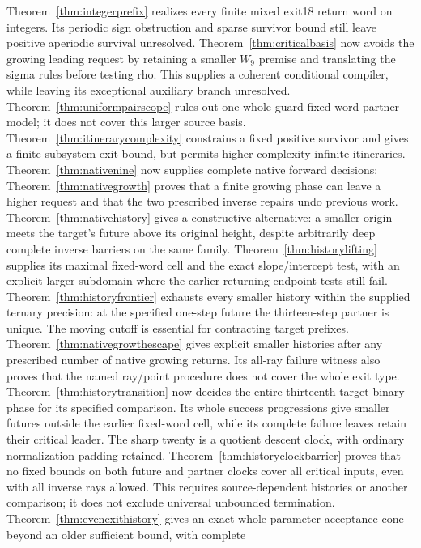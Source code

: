 \documentclass[11pt]{article}
\begin{document}
Theorem~\ref{thm:integerprefix} realizes every finite mixed exit18 return
word on integers. Its periodic sign obstruction and sparse survivor bound
still leave positive aperiodic survival unresolved.
Theorem~\ref{thm:criticalbasis} now avoids the growing leading request
by retaining a smaller $W_9$ premise and translating the sigma rules
before testing rho. This supplies a coherent conditional compiler,
while leaving its exceptional auxiliary branch unresolved.
Theorem~\ref{thm:uniformpairscope} rules out one whole-guard fixed-word
partner model; it does not cover this larger source basis.
Theorem~\ref{thm:itinerarycomplexity} constrains a fixed positive
survivor and gives a finite subsystem exit bound, but permits
higher-complexity infinite itineraries.
Theorem~\ref{thm:nativenine} now supplies complete native forward decisions;
Theorem~\ref{thm:nativegrowth} proves that a finite growing phase can
leave a higher request and that the two prescribed inverse repairs undo
previous work. Theorem~\ref{thm:nativehistory} gives a constructive
alternative: a smaller origin meets the target's future above its original
height, despite arbitrarily deep complete inverse barriers on the same
family. Theorem~\ref{thm:historylifting} supplies its maximal fixed-word
cell and the exact slope/intercept test, with an explicit larger subdomain
where the earlier returning endpoint tests still fail.
Theorem~\ref{thm:historyfrontier} exhausts every smaller history within
the supplied ternary precision: at the specified one-step future the
thirteen-step partner is unique. The moving cutoff is essential for
contracting target prefixes.
Theorem~\ref{thm:nativegrowthescape} gives explicit smaller histories
after any prescribed number of native growing returns. Its all-ray
failure witness also proves that the named ray/point procedure does not
cover the whole exit type.
Theorem~\ref{thm:historytransition} now decides the entire thirteenth-target
binary phase for its specified comparison. Its whole success progressions
give smaller futures outside the earlier fixed-word cell, while its
complete failure leaves retain their critical leader. The sharp twenty
is a quotient descent clock, with ordinary normalization padding retained.
Theorem~\ref{thm:historyclockbarrier} proves that no fixed bounds on
both future and partner clocks cover all critical inputs, even with all
inverse rays allowed. This requires source-dependent histories or another
comparison; it does not exclude universal unbounded termination.
Theorem~\ref{thm:evenexithistory} gives an exact whole-parameter
acceptance cone beyond an older sufficient bound, with complete
\end{document}
